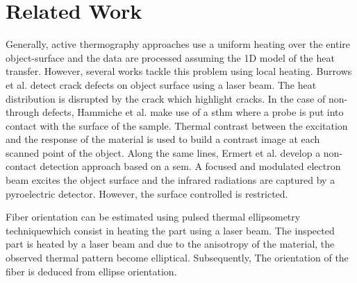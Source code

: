 
\section{Related Work}\label{sec:2}

Generally, active thermography approaches use a uniform heating over the entire object-surface and the data are processed assuming the 1D model of the heat transfer. However, several works tackle this problem using local heating.
Burrows et al.\cite{Burrows2011} detect crack defects on object surface using a laser beam. The heat distribution is disrupted by the crack which highlight cracks.
In the case of non-through defects, Hammiche et al.\cite{Hammiche1996} make use of a \ac{sthm} where a probe is put into contact with the surface of the sample. Thermal contrast between the excitation and the response of the material is used to build a contrast image at each scanned point of the object.
Along the same lines, Ermert et al.\cite{Ermert1984} develop a non-contact detection approach based on a \ac{sem}. A focused and modulated electron beam excites the object surface and the infrared radiations are captured by a pyroelectric detector. However, the surface controlled is restricted.

Fiber orientation can be estimated using pulsed thermal ellipsometry technique\cite{Cielo1987}which consist in heating the part using a laser beam. The inspected part is heated by a laser beam and due to the anisotropy of the material, the observed thermal pattern become elliptical. Subsequently, The orientation of the fiber is deduced from ellipse orientation.

